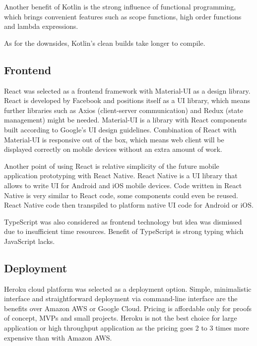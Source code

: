 Another benefit of Kotlin is the strong influence of functional programming, which brings convenient features such as scope functions, high order functions and lambda expressions.

As for the downsides, Kotlin's clean builds take longer to compile.\cite{kotlin-compile}

\subsection{Frontend}\label{subsec:ts-frontend}

React was selected as a frontend framework with Material-UI as a design library.\cite{react, material}
React is developed by Facebook and positions itself as a UI library, which means further libraries such as Axios (client-server communication) and Redux (state management) might be needed.\cite{axios, redux}
Material-UI is a library with React components built according to Google's UI design guidelines.
Combination of React with Material-UI is responsive out of the box, which means web client will be displayed correctly on mobile devices without an extra amount of work.

Another point of using React is relative simplicity of the future mobile application prototyping with React Native.\cite{react-native}
React Native is a UI library that allows to write UI for Android and iOS mobile devices.
Code written in React Native is very similar to React code, some components could even be reused.
React Native code then transpiled to platform native UI code for Android or iOS\@.

TypeScript was also considered as frontend technology but idea was dismissed due to insufficient time resources.
Benefit of TypeScript is strong typing which JavaScript lacks.\cite{typescript}

\subsection{Deployment}\label{subsec:ts-deployment}

Heroku cloud platform was selected as a deployment option.
Simple, minimalistic interface and straightforward deployment via command-line interface are the benefits over Amazon AWS or Google Cloud.
Pricing is affordable only for proofs of concept, MVPs and small projects.
Heroku is not the best choice for large application or high throughput application as the pricing goes 2 to 3 times more expensive than with Amazon AWS\@.
